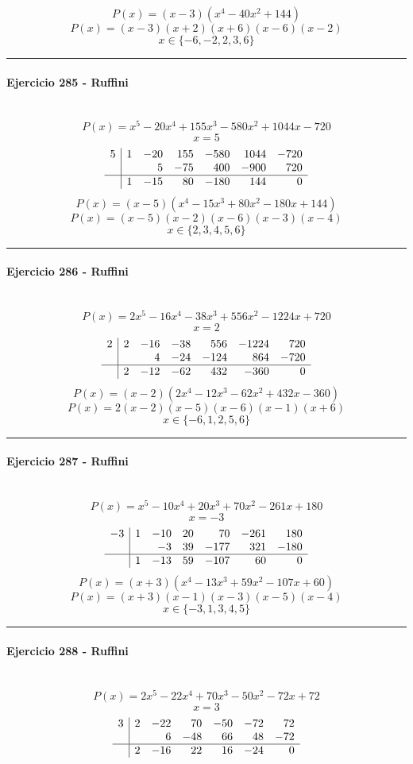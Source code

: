 \documentclass[10pt,a4paper]{article}
\newcommand{\res}[1]{\paragraph{#1}\mbox{}\\[-1.2em]}
\begin{document}
\[ P(x)=(x-3)(x^{4} - 40 x^{2} + 144) \]
\[ P(x)=(x-3)(x+2)(x+6)(x-6)(x-2) \]
\[ \boxed{x\in\{-6,-2,2,3,6\}} \]
\vspace{1mm}\hrule\vspace{2mm}
\res{Ejercicio 285 - Ruffini}
\[ P(x)=x^{5} - 20 x^{4} + 155 x^{3} - 580 x^{2} + 1044 x - 720 \]
\[ x=5 \]
\[\begin{array}{r|rrrrrr}5 & 1 & -20 & 155 & -580 & 1044 & -720\\  &  & 5 & -75 & 400 & -900 & 720\\\hline  & 1 & -15 & 80 & -180 & 144 & 0\end{array}\]
\[ P(x)=(x-5)(x^{4} - 15 x^{3} + 80 x^{2} - 180 x + 144) \]
\[ P(x)=(x-5)(x-2)(x-6)(x-3)(x-4) \]
\[ \boxed{x\in\{2,3,4,5,6\}} \]
\vspace{1mm}\hrule\vspace{2mm}
\res{Ejercicio 286 - Ruffini}
\[ P(x)=2 x^{5} - 16 x^{4} - 38 x^{3} + 556 x^{2} - 1224 x + 720 \]
\[ x=2 \]
\[\begin{array}{r|rrrrrr}2 & 2 & -16 & -38 & 556 & -1224 & 720\\  &  & 4 & -24 & -124 & 864 & -720\\\hline  & 2 & -12 & -62 & 432 & -360 & 0\end{array}\]
\[ P(x)=(x-2)(2 x^{4} - 12 x^{3} - 62 x^{2} + 432 x - 360) \]
\[ P(x)=2(x-2)(x-5)(x-6)(x-1)(x+6) \]
\[ \boxed{x\in\{-6,1,2,5,6\}} \]
\vspace{1mm}\hrule\vspace{2mm}
\res{Ejercicio 287 - Ruffini}
\[ P(x)=x^{5} - 10 x^{4} + 20 x^{3} + 70 x^{2} - 261 x + 180 \]
\[ x=-3 \]
\[\begin{array}{r|rrrrrr}-3 & 1 & -10 & 20 & 70 & -261 & 180\\  &  & -3 & 39 & -177 & 321 & -180\\\hline  & 1 & -13 & 59 & -107 & 60 & 0\end{array}\]
\[ P(x)=(x+3)(x^{4} - 13 x^{3} + 59 x^{2} - 107 x + 60) \]
\[ P(x)=(x+3)(x-1)(x-3)(x-5)(x-4) \]
\[ \boxed{x\in\{-3,1,3,4,5\}} \]
\vspace{1mm}\hrule\vspace{2mm}
\res{Ejercicio 288 - Ruffini}
\[ P(x)=2 x^{5} - 22 x^{4} + 70 x^{3} - 50 x^{2} - 72 x + 72 \]
\[ x=3 \]
\[\begin{array}{r|rrrrrr}3 & 2 & -22 & 70 & -50 & -72 & 72\\  &  & 6 & -48 & 66 & 48 & -72\\\hline  & 2 & -16 & 22 & 16 & -24 & 0\end{array}\]
\end{document}
